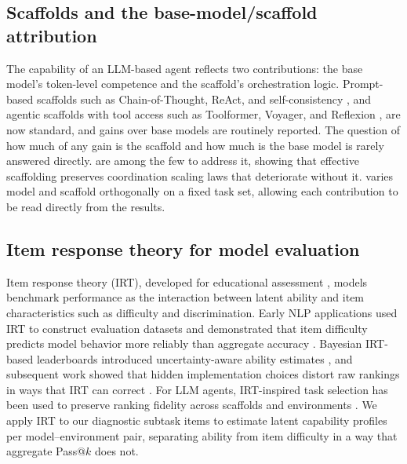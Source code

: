 \subsection{Scaffolds and the base-model/scaffold attribution}

The capability of an LLM-based agent reflects two contributions: the base model's token-level competence and the scaffold's orchestration logic. Prompt-based scaffolds such as Chain-of-Thought, ReAct, and self-consistency \autocite{wei2022chain, yao2022react, wang2022self}, and agentic scaffolds with tool access such as Toolformer, Voyager, and Reflexion \autocite{schick2023toolformer, wang2023voyager, shinn2023reflexion0}, are now standard, and gains over base models are routinely reported. The question of how much of any gain is the scaffold and how much is the base model is rarely answered directly. \textcite{meirelesinfluence} are among the few to address it, showing that effective scaffolding preserves coordination scaling laws that deteriorate without it. \corral varies model and scaffold orthogonally on a fixed task set, allowing each contribution to be read directly from the results.

\subsection{Item response theory for model evaluation}

Item response theory (IRT), developed for educational assessment \autocite{hori2022item, toland2014practical, lovelace2013best}, models benchmark performance as the interaction between latent ability and item characteristics such as difficulty and discrimination. Early NLP applications used IRT to construct evaluation datasets and demonstrated that item difficulty predicts model behavior more reliably than aggregate accuracy \autocite{lalor2016building, lalor2018understanding}. Bayesian IRT-based leaderboards introduced uncertainty-aware ability estimates \autocite{rodriguez2021evaluation}, and subsequent work showed that hidden implementation choices distort raw rankings in ways that IRT can correct \autocite{schilling2025lifting, zhou2026lost}. For LLM agents, IRT-inspired task selection has been used to preserve ranking fidelity across scaffolds and environments \autocite{ndzomga2026efficient}. We apply IRT to our diagnostic subtask items to estimate latent capability profiles per model--environment pair, separating ability from item difficulty in a way that aggregate Pass@$k$ does not.

